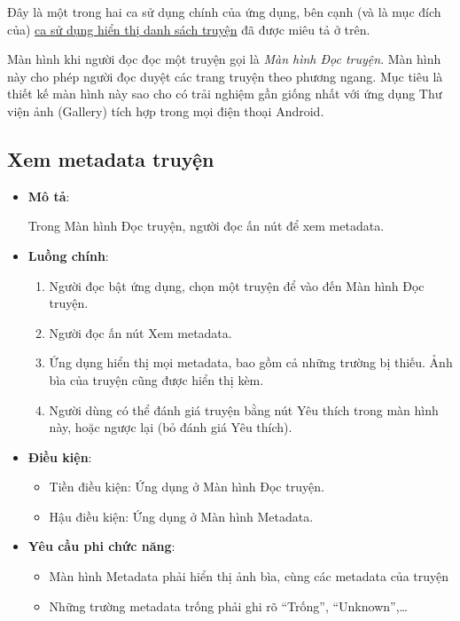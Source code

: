 \documentclass[../../thesis]{subfiles}
\begin{document}
Đây là một trong hai ca sử dụng chính của ứng dụng, bên cạnh (và là mục đích
của) \protect\hyperlink{P3.3.2-show-library}{ca sử dụng hiển thị danh sách
truyện} đã được miêu tả ở trên.

Màn hình khi người đọc đọc một truyện gọi là \emph{Màn hình Đọc truyện}. Màn
hình này cho phép người đọc duyệt các trang truyện theo phương ngang. Mục tiêu
là thiết kế màn hình này sao cho có trải nghiệm gần giống nhất với ứng dụng Thư
viện ảnh (Gallery) tích hợp trong mọi điện thoại Android.

\subsection{Xem metadata truyện}\label{sec:view-metadata}

\begin{itemize}
    \item
        \textbf{Mô tả}:

        Trong Màn hình Đọc truyện, người đọc ấn nút để xem metadata.
    \item
        \textbf{Luồng chính}:

        \begin{enumerate}
            \item
                Người đọc bật ứng dụng, chọn một truyện để vào đến Màn hình Đọc
                truyện.
            \item
                Người đọc ấn nút Xem metadata.
            \item
                Ứng dụng hiển thị mọi metadata, bao gồm cả những trường bị
                thiếu. Ảnh bìa của truyện cũng được hiển thị kèm.
            \item
                Người dùng có thể đánh giá truyện bằng nút Yêu thích trong màn
                hình này, hoặc ngược lại (bỏ đánh giá Yêu thích).
        \end{enumerate}
    \item
        \textbf{Điều kiện}:

        \begin{itemize}
            \item
                Tiền điều kiện: Ứng dụng ở Màn hình Đọc truyện.
            \item
                Hậu điều kiện: Ứng dụng ở Màn hình Metadata.
        \end{itemize}
    \item
        \textbf{Yêu cầu phi chức năng}:

        \begin{itemize}
            \item
                Màn hình Metadata phải hiển thị ảnh bìa, cùng các metadata của
                truyện
            \item
                Những trường metadata trống phải ghi rõ ``Trống'',
                ``Unknown'',\ldots{}
        \end{itemize}
  \end{itemize}
\end{document}
